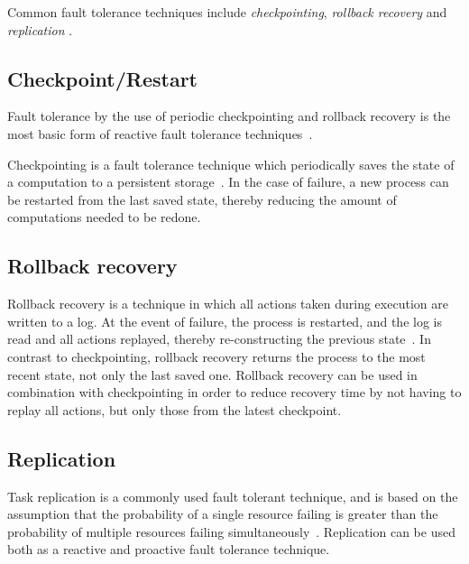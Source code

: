 \documentclass{cslthse-msc}
\begin{document}
Common fault tolerance techniques include \emph{checkpointing}, \emph{rollback recovery} and \emph{replication} \cite{relGridSystems}.

\subsection{Checkpoint/Restart} \label{subsec:background_checkpoint}
Fault tolerance by the use of periodic checkpointing and rollback recovery is the most basic form of reactive fault tolerance techniques~\cite{surveyFaultParallel}.

Checkpointing is a fault tolerance technique which periodically saves the state of a computation to a persistent storage~\cite{relGridSystems, surveyFaultParallel}. In the case of failure, a new process can be restarted from the last saved state, thereby reducing the amount of computations needed to be redone.


\subsection{Rollback recovery} \label{subsec:background_rollback}
Rollback recovery is a technique in which all actions taken during execution are written to a log. At the event of failure, the process is restarted, and the log is read and all actions replayed, thereby re-constructing the previous state~\cite{surveyFaultParallel}. In contrast to checkpointing, rollback recovery returns the process to the most recent state, not only the last saved one. Rollback recovery can be used in combination with checkpointing in order to reduce recovery time by not having to replay all actions, but only those from the latest checkpoint.

\subsection{Replication} \label{subsec:background_replication}
Task replication is a commonly used fault tolerant technique, and is based on the assumption that the probability of a single resource failing is greater than the probability of multiple resources failing simultaneously~\cite{faultToleranceGrid}. Replication can be used both as a reactive and proactive fault tolerance technique. %
\end{document}

